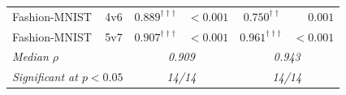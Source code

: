 \begin{table}[t]
\begin{tabular}{llrrrr}
    Fashion-MNIST & 4v6            & $0.889^{{\dagger\dagger\dagger}}$ & $<0.001$ & $0.750^{{\dagger\dagger}}$ & $0.001$ \\
    Fashion-MNIST & 5v7            & $0.907^{{\dagger\dagger\dagger}}$ & $<0.001$ & $0.961^{{\dagger\dagger\dagger}}$ & $<0.001$ \\
    \midrule
    \multicolumn{2}{l}{\textit{Median $\rho$}}  & \multicolumn{2}{c}{\textit{0.909}} & \multicolumn{2}{c}{\textit{0.943}} \\
    \multicolumn{2}{l}{\textit{Significant at $p<0.05$}} & \multicolumn{2}{c}{\textit{14/14}} & \multicolumn{2}{c}{\textit{14/14}} \\
    \bottomrule
  \end{tabular}
\end{table}